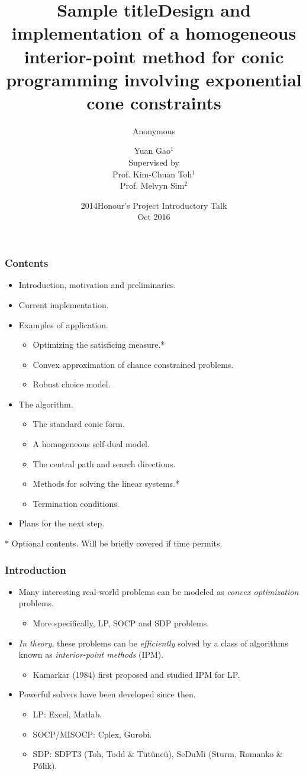 \documentclass{beamer}
\title{Sample title}
\author{Anonymous}
\institute{ShareLaTeX}
\date{2014}
\title[About Beamer] %
 {Design and implementation of a homogeneous interior-point method for conic programming involving exponential cone constraints}
\author[gaoyuan] %
 {Yuan Gao$^1$ \\[1ex] Supervised by \\[0.5ex] Prof. Kim-Chuan Toh$^1$\\Prof. Melvyn Sim$^2$}
\institute[VFU] %
 {
 	$1$ Department of Mathematics, National University of Singapore\\
 	$2$ Department of Decision Sciences, National University of Singappore
 }
\date %
{Honour's Project Introductory Talk\\ Oct 2016}
\begin{document}
 
\frame{\titlepage}
 
\begin{frame}
\frametitle{Contents}
\begin{itemize}
	\item Introduction, motivation and preliminaries.
	\item Current implementation.
	\item Examples of application.
	\begin{itemize}
		\item Optimizing the satisficing measure.*
		\item Convex approximation of chance constrained problems.
		\item Robust choice model.
	\end{itemize}
		\item The algorithm.
	\begin{itemize}
		\item The standard conic form.
		\item A homogeneous self-dual model.
		\item The central path and search directions.
		\item Methods for solving the linear systems.*
		\item Termination conditions.
	\end{itemize}
	\item Plans for the next step.
\end{itemize}
\small{$*$ Optional contents. Will be briefly covered if time permits.}
\end{frame}

\begin{frame}
\frametitle{Introduction}
\begin{itemize}
\item Many interesting real-world problems can be modeled as \textit{convex optimization} problems.
	\begin{itemize}
		\item More specifically, LP, SOCP and SDP problems.
	\end{itemize}
\item \textit{In theory}, these problems can be \textit{efficiently} solved by a class of algorithms known as \textit{interior-point methods} (IPM).
	\begin{itemize}
		\item Kamarkar (1984) first proposed and studied IPM for LP.
	\end{itemize}
\item Powerful solvers have been developed since then.
	\begin{itemize}
		\item LP: Excel, Matlab.
		\item SOCP/MISOCP: Cplex, Gurobi.
		\item SDP: SDPT3 (Toh, Todd \& T\"ut\"unc\"u), SeDuMi (Sturm, Romanko \& Pólik).
	\end{itemize}
\end{itemize}
\end{frame}
\end{document}
